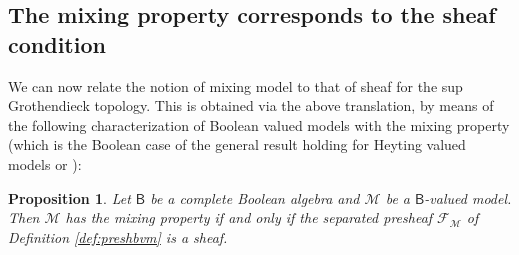 \documentclass[11pt]{amsart}
\newcommand{\F}{\mathcal{F}}
\theoremstyle{plain}
\newtheorem{proposition}[theorem]{Proposition}
\theoremstyle{definition}
\theoremstyle{plain}
\theoremstyle{remark}
\newcommand{\M}{\mathcal{M}}
\newcommand{\bool}[1]{\mathsf{#1}}
\newcommand{\0}{\mathsf{0}}
\renewcommand{\1}{\mathsf{1}}
\renewcommand{\2}{\mathsf{2}}
\theoremstyle{definition}
\begin{document}
\subsection{The mixing property corresponds to the sheaf condition}
We can now relate the notion of mixing model to that of sheaf for the sup Grothendieck topology. This is obtained via the above translation, by means of the following characterization of Boolean valued models with the mixing property (which is the Boolean case of the general result holding for Heyting valued models \cite[Proposition 5.6]{MONRO86} or \cite[Theorem 4.13]{FOURSCOTT}):
\begin{proposition}
\label{chr:mix}
Let $\bool{B}$ be a complete Boolean algebra and
$\M$ be a $\bool{B}$-valued model.
Then $\M$ has the mixing property if and only if the separated presheaf 
$\F_\M$
of Definition \ref{def:preshbvm} is a sheaf.
\end{proposition}
\end{document}
